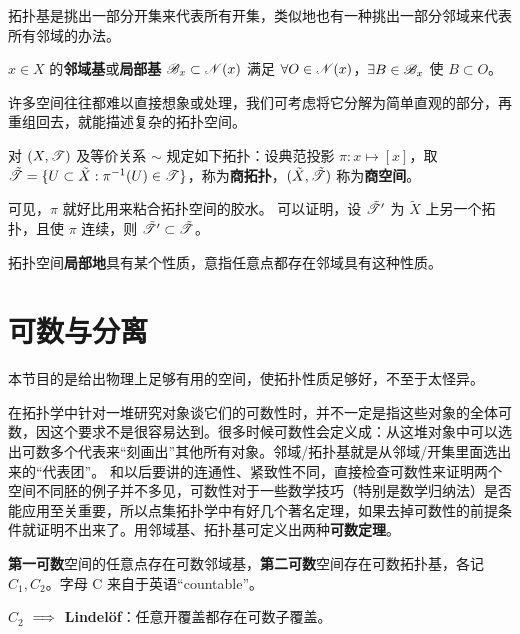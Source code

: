 拓扑基是挑出⼀部分开集来代表所有开集，类似地也有一种挑出⼀部分邻域来代表所有邻域的办法。

\begin{definition}
    $x\in X$ 的\textbf{邻域基}或\textbf{局部基} $\mathscr B_x\subset\mathscr N(x)$ 满足 $\forall O\in\mathscr N(x)$，$\exists B\in\mathscr B_x$ 使 $B\subset O$。
\end{definition}

许多空间往往都难以直接想象或处理，我们可考虑将它分解为简单直观的部分，再重组回去，就能描述复杂的拓扑空间。

\begin{definition}
    对 $(X,\mathscr T)$ 及等价关系 $\sim$ 规定如下拓扑：设典范投影 $\pi:x\mapsto [x]$，取 $\tilde{\mathscr T}=\{U \subset \tilde X:\pi^{-1}(U)\in\mathscr T\}$，称为\textbf{商拓扑}，$(\tilde X,\tilde{\mathscr T})$ 称为\textbf{商空间}。
\end{definition}
可见，$\pi$ 就好比用来粘合拓扑空间的胶水。
可以证明，设 $\tilde{\mathscr T}^{\prime}$ 为 $\tilde X$ 上另一个拓扑，且使 $\pi$ 连续，则 $\tilde{\mathscr T}^{\prime} \subset \tilde{\mathscr T}$。

\begin{definition}
    拓扑空间\textbf{局部地}具有某个性质，意指任意点都存在邻域具有这种性质。
\end{definition}

\section{可数与分离}
本节目的是给出物理上足够有用的空间，使拓扑性质足够好，不至于太怪异。

在拓扑学中针对一堆研究对象谈它们的可数性时，并不一定是指这些对象的全体可数，因这个要求不是很容易达到。很多时候可数性会定义成：从这堆对象中可以选出可数多个代表来“刻画出”其他所有对象。邻域/拓扑基就是从邻域/开集里面选出来的“代表团”。
和以后要讲的连通性、紧致性不同，直接检查可数性来证明两个空间不同胚的例子并不多见，可数性对于一些数学技巧（特别是数学归纳法）是否能应用至关重要，所以点集拓扑学中有好几个著名定理，如果去掉可数性的前提条件就证明不出来了。用邻域基、拓扑基可定义出两种\textbf{可数定理}。

\begin{definition}\textbf{第一可数}空间的任意点存在可数邻域基，\textbf{第二可数}空间存在可数拓扑基，各记 $C_1,C_2$。字母 C 来⾃于英语“countable”。
\end{definition}

\begin{theorem}
    $C_2$ $\implies$ \textbf{Lindel\"of}：任意开覆盖都存在可数子覆盖。
\end{theorem}

